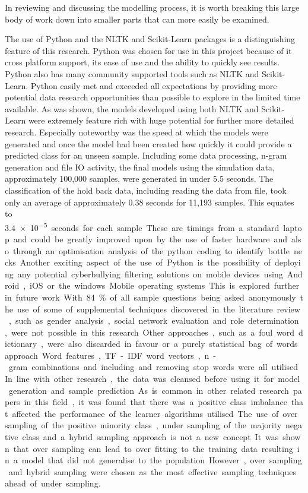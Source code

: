 In reviewing and discussing the modelling process, it is worth breaking this large body of work down into smaller parts that can more easily be examined. 

The use of Python and the NLTK and Scikit-Learn packages is a distinguishing feature of this research. Python was chosen for use in this project because of it cross platform support, its ease of use and the ability to quickly see results. Python also has many community supported tools such as NLTK and Scikit-Learn. Python easily met and exceeded all expectations by providing more potential data research opportunities than possible to explore in the limited time available. As was shown, the models developed using both NLTK and Scikit-Learn were extremely feature rich with huge potential for further more detailed research. Especially noteworthy was the speed at which the models were generated and once the model had been created how quickly it could provide a predicted class for an unseen sample. Including some data processing, n-gram generation and file IO activity, the final models using the simulation data, approximately 100,000 samples, were generated in under 5.5 seconds. The classification of the hold back data, including reading the data from file, took only an average of approximately 0.38 seconds for 11,193 samples. This equates to \SI{3.4e-5} seconds for each sample. These are timings from a standard laptop and could be greatly improved upon by the use of faster hardware and also through an optimisation analysis of the python coding to identify bottle necks. Another exciting aspect of the use of Python is the possibility of deploying any potential cyberbullying filtering solutions on mobile devices using Android, iOS or the windows Mobile operating systems. This is explored further in future work.

With 84\% of all sample questions being asked anonymously the use of some of supplemental techniques discovered in the literature review, such as gender analysis, social network evaluation and role determination, were not possible in this research. Other approaches, such as a foul word dictionary, were also discarded in favour or a purely statistical bag of words approach. Word features, TF-IDF word vectors, n-gram combinations and including and removing stop words were all utilised. In line with other research, the data was cleansed before using it for model generation and sample prediction. 

As is common in other related research papers in this field, it was found that there was a positive class imbalance that affected the performance of the learner algorithms utilised. The use of over sampling of the positive minority class, under sampling of the majority negative class and a hybrid sampling approach is not a new concept. It was shown that over sampling can lead to over fitting to the training data resulting in a model that did not generalise to the population. However, over sampling and hybrid sampling were chosen as the most effective sampling techniques ahead of under sampling.

